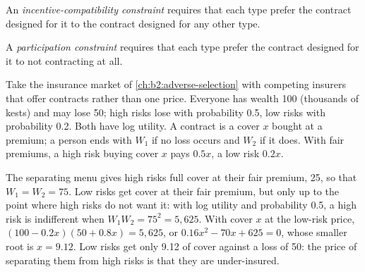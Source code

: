 \begin{definition}\label{def:b2:signalling-and-screening:ic}
An \emph{incentive-compatibility constraint} requires that each type prefer
the contract designed for it to the contract designed for any other type.
\end{definition}

\begin{definition}\label{def:b2:signalling-and-screening:pc}
A \emph{participation constraint} requires that each type prefer the contract designed
for it to not contracting at all.
\end{definition}

Take the insurance market of \cref{ch:b2:adverse-selection} with competing insurers that offer contracts rather than one
price. Everyone has wealth 100 (thousands of kests) and may lose 50; high risks lose with probability 0.5, low risks with
probability 0.2. Both have log utility. A contract is a cover $x$ bought at a premium; a person ends with $W_1$ if no loss
occurs and $W_2$ if it does. With fair premiums, a high risk buying cover $x$ pays $0.5x$, a low risk $0.2x$.

The separating menu gives high risks full cover at their fair premium, 25, so that $W_1 = W_2 = 75$. Low risks get cover at
their fair premium, but only up to the point where high risks do not want it: with log utility and probability 0.5, a
high risk is indifferent when $W_1 W_2 = 75^2 = 5{,}625$. With cover $x$ at the low-risk price, $(100 - 0.2x)(50 + 0.8x) = 5{,}625$,
or $0.16x^2 - 70x + 625 = 0$, whose smaller root is $x = 9.12$. Low risks get only 9.12 of cover against a loss of 50: the
price of separating them from high risks is that they are under-insured.

